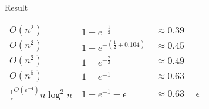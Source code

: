 \begin{frame}{Result}
    \begin{center}
        \Large
        \begin{tabular}{l l l}
            \hline
            $O(n^2)$
            &
            $1 - e^{-\frac{1}{2}}$
            &
            $\approx 0.39$
            \\
            \color{orange}$O(n^2)$
            &
            \color{orange}$1 - e^{-(\frac{1}{2} + 0.104)}$
            &
            $\approx 0.45$
            \\
            \color{orange}$O(n^2)$
            & 
            \color{orange}$1 - e^{-\frac{2}{3}}$ 
            &
            $\approx 0.49$
            \\
            $O(n^5)$
            & 
            $1 - e^{-1}$ 
            &
            $\approx 0.63$
            \\
            $\frac{1}{\epsilon}^{O(\epsilon^{-4})}n \log^2 n$
            & 
            $1 - e^{-1} - \epsilon$ 
            &
            $\approx 0.63 - \epsilon$
            \\
            \hline
        \end{tabular}
        
    \end{center}
\end{frame}